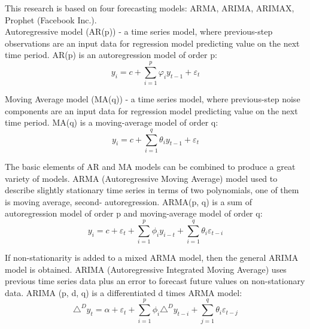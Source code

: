 This research is based on four forecasting models: ARMA, ARIMA, ARIMAX, Prophet (Facebook Inc.).\\ 
Autoregressive model (AR(p)) - a time series model, where previous-step observations are an input data for regression model predicting value on the next time period. AR(p) is an autoregression model of order p:
\begin{equation}\label{eq:AR}
y_i = c + \sum_{i=1}^{p}\varphi_i y_{t-1} + \varepsilon_t 
    \end{equation}

Moving Average model (MA(q)) - a time series model, where previous-step noise components are an input data for regression model predicting value on the next time period. MA(q) is a moving-average model of order q:
\begin{equation}\label{eq:MA}
y_i = c + \sum_{i=1}^{q}\theta_i y_{t-1} + \varepsilon_t 
    \end{equation}

The basic elements of AR and MA models can be combined to produce a great variety of models. 
ARMA (Autoregressive Moving Average) model used to describe slightly stationary time series in terms of two polynomials, one of them is moving average, second- autoregression. ARMA(p, q) is a sum of autoregression model of order p and moving-average model of order q:
\begin{equation}\label{eq:ARMA}
y_i = c +\varepsilon_t +\sum_{i=1}^{p}\phi_i y_{i-t} +\sum_{i=1}^{q}\theta_i \varepsilon_{t-i}
    \end{equation}

If non-stationarity is added to a mixed ARMA model, then the general ARIMA model is obtained. ARIMA (Autoregressive Integrated Moving Average) uses previous time series data plus an error to forecast future values on non-stationary data. ARIMA (p, d, q) is a differentiated d times ARMA model:
\begin{equation}\label{eq:ARIMA}
\triangle^{D} y_{t} = \alpha +\varepsilon_t + \sum_{i=1}^{p}\phi_i \triangle^{D} y_{t-i} + \sum_{j=1}^{q}\theta_i \varepsilon_{t-j}
\end{equation}


